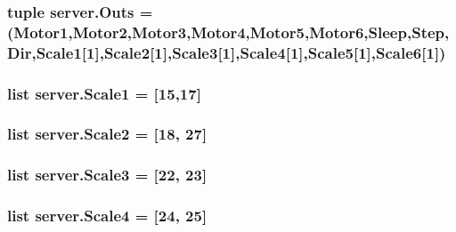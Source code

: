 \subsubsection[{\texorpdfstring{Outs}{Outs}}]{\setlength{\rightskip}{0pt plus 5cm}tuple server.\+Outs = ({\bf Motor1},{\bf Motor2},{\bf Motor3},{\bf Motor4},{\bf Motor5},{\bf Motor6},{\bf Sleep},{\bf Step},{\bf Dir},{\bf Scale1}\mbox{[}1\mbox{]},{\bf Scale2}\mbox{[}1\mbox{]},{\bf Scale3}\mbox{[}1\mbox{]},{\bf Scale4}\mbox{[}1\mbox{]},{\bf Scale5}\mbox{[}1\mbox{]},{\bf Scale6}\mbox{[}1\mbox{]})}\hypertarget{namespaceserver_aaabb4b971ab7664a476a58c39ed286f1}{}\label{namespaceserver_aaabb4b971ab7664a476a58c39ed286f1}
\subsubsection[{\texorpdfstring{Scale1}{Scale1}}]{\setlength{\rightskip}{0pt plus 5cm}list server.\+Scale1 = \mbox{[}15,17\mbox{]}}\hypertarget{namespaceserver_a4dc79f107ff469954b71e2721c2e52b5}{}\label{namespaceserver_a4dc79f107ff469954b71e2721c2e52b5}
\subsubsection[{\texorpdfstring{Scale2}{Scale2}}]{\setlength{\rightskip}{0pt plus 5cm}list server.\+Scale2 = \mbox{[}18, 27\mbox{]}}\hypertarget{namespaceserver_ab1c92a82b94362f20e2d00d9447f5490}{}\label{namespaceserver_ab1c92a82b94362f20e2d00d9447f5490}
\subsubsection[{\texorpdfstring{Scale3}{Scale3}}]{\setlength{\rightskip}{0pt plus 5cm}list server.\+Scale3 = \mbox{[}22, 23\mbox{]}}\hypertarget{namespaceserver_afd40f5f5a35ccf0b353b7d4553df34b8}{}\label{namespaceserver_afd40f5f5a35ccf0b353b7d4553df34b8}
\subsubsection[{\texorpdfstring{Scale4}{Scale4}}]{\setlength{\rightskip}{0pt plus 5cm}list server.\+Scale4 = \mbox{[}24, 25\mbox{]}}\hypertarget{namespaceserver_af086972c970a98d91c403e604c9637e2}{}\label{namespaceserver_af086972c970a98d91c403e604c9637e2}
